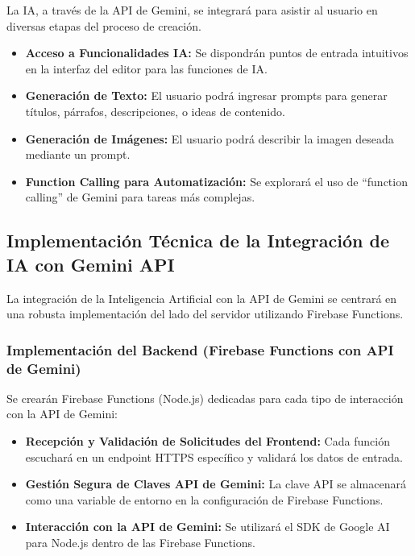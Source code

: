 \documentclass[12pt,a4paper]{report}
\begin{document}
La IA, a través de la API de Gemini, se integrará para asistir al usuario en diversas etapas del proceso de creación.

\begin{itemize}
\item \textbf{Acceso a Funcionalidades IA:} Se dispondrán puntos de entrada intuitivos en la interfaz del editor para las funciones de IA.

\item \textbf{Generación de Texto:} El usuario podrá ingresar prompts para generar títulos, párrafos, descripciones, o ideas de contenido.

\item \textbf{Generación de Imágenes:} El usuario podrá describir la imagen deseada mediante un prompt.

\item \textbf{Function Calling para Automatización:} Se explorará el uso de ``function calling'' de Gemini para tareas más complejas.
\end{itemize}

\subsection{Implementación Técnica de la Integración de IA con Gemini API}

La integración de la Inteligencia Artificial con la API de Gemini se centrará en una robusta implementación del lado del servidor utilizando Firebase Functions.

\subsubsection{Implementación del Backend (Firebase Functions con API de Gemini)}

Se crearán Firebase Functions (Node.js) dedicadas para cada tipo de interacción con la API de Gemini:

\begin{itemize}
\item \textbf{Recepción y Validación de Solicitudes del Frontend:} Cada función escuchará en un endpoint HTTPS específico y validará los datos de entrada.

\item \textbf{Gestión Segura de Claves API de Gemini:} La clave API se almacenará como una variable de entorno en la configuración de Firebase Functions.

\item \textbf{Interacción con la API de Gemini:} Se utilizará el SDK de Google AI para Node.js dentro de las Firebase Functions.
\end{itemize}
\end{document}
